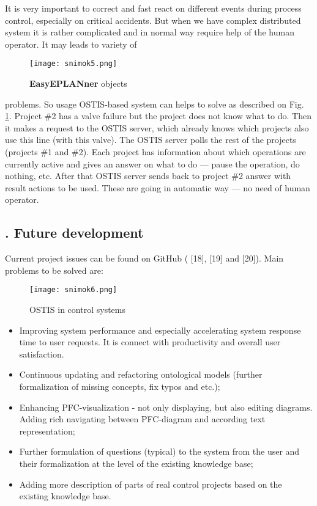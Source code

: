 \documentclass[7pt]{article} \twocolumn
\newcommand{\RomanNumeralCaps}[1]
{\MakeUppercase{\romannumeral #1}} %
\begin{document}
It is very important to correct and fast react on
different events during process control, especially on
critical accidents. But when we have complex distributed
system it is rather complicated and in normal way require
help of the human operator. It may leads to variety of \newpage
\begin{figure}
    \centering
    \texttt{[image: snimok5.png]}
    \caption{\textbf{EasyEPLANner} objects}
    \label{fig:easy}
\end{figure}
\noindent problems. So usage OSTIS-based system can helps to
solve as described on Fig. \ref{fig:easy}. Project \#2 has a valve failure
but the project does not know what to do. Then it makes a
request to the OSTIS server, which already knows which
projects also use this line (with this valve). The OSTIS
server polls the rest of the projects (projects \#1 and \#2).
Each project has information about which operations are
currently active and gives an answer on what to do —
pause the operation, do nothing, etc. After that OSTIS server sends back to project \#2 answer with result actions
to be used. These are going in automatic way — no need
of human operator.
\begin{center} \vspace{0.15cm}
\section*{\footnotesize \RomanNumeralCaps{8}. Future development}
\end{center}
\vspace{0.15cm}
\par Current project issues can be found on GitHub ( [18],
[19] and [20]). Main problems to be solved are: \vspace{1cm}
\begin{figure}
    \centering
    \texttt{[image: snimok6.png]}
    \caption{OSTIS in control systems}
\end{figure}
\begin{itemize}
    \item Improving system performance and especially accelerating system response time to user requests. It is connect with productivity and overall user satisfaction.
    \item Continuous updating and refactoring ontological models (further formalization of missing concepts, fix typos and etc.);
    \item Enhancing PFC-visualization - not only displaying, but also editing diagrams. Adding rich navigating between PFC-diagram and according text representation;
    \item Further formulation of questions (typical) to the system from the user and their formalization at the level of the existing knowledge base;
    \item Adding more description of parts of real control projects based on the existing knowledge base.
\end{itemize} \par
\end{document}
